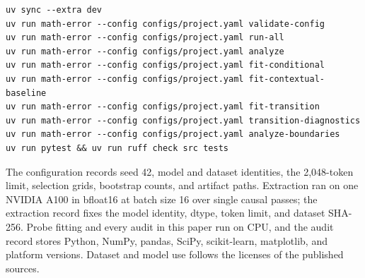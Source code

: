 \documentclass{article}
\begin{document}
\begin{verbatim}
uv sync --extra dev
uv run math-error --config configs/project.yaml validate-config
uv run math-error --config configs/project.yaml run-all
uv run math-error --config configs/project.yaml analyze
uv run math-error --config configs/project.yaml fit-conditional
uv run math-error --config configs/project.yaml fit-contextual-baseline
uv run math-error --config configs/project.yaml fit-transition
uv run math-error --config configs/project.yaml transition-diagnostics
uv run math-error --config configs/project.yaml analyze-boundaries
uv run pytest && uv run ruff check src tests
\end{verbatim}

The configuration records seed 42, model and dataset identities, the 2,048-token limit, selection
grids, bootstrap counts, and artifact paths. Extraction ran on one NVIDIA A100 in bfloat16 at batch
size 16 over single causal passes; the extraction record fixes the model identity, dtype, token
limit, and dataset SHA-256. Probe fitting and every audit in this paper run on CPU, and the audit
record stores Python, NumPy, pandas, SciPy, scikit-learn, matplotlib, and platform versions.
Dataset and model use follows the licenses of the published sources.

\newpage

\end{document}
